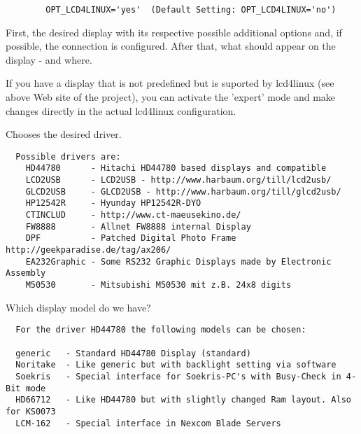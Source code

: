 \begin{example}
\begin{verbatim}
        OPT_LCD4LINUX='yes'  (Default Setting: OPT_LCD4LINUX='no')
\end{verbatim}
\end{example}

    First, the desired display with its respective possible additional options
    and, if possible, the connection is configured. After that, what should appear 
    on the display - and where.

    If you have a display that is not predefined but is suported by lcd4linux 
    (see above Web site of the project), you can activate the 'expert' mode and make 
    changes directly in the actual lcd4linux configuration.

\begin{description}

  Chooses the desired driver.

\begin{example}
\begin{verbatim}
  Possible drivers are:
    HD44780      - Hitachi HD44780 based displays and compatible
    LCD2USB      - LCD2USB - http://www.harbaum.org/till/lcd2usb/
    GLCD2USB     - GLCD2USB - http://www.harbaum.org/till/glcd2usb/
    HP12542R     - Hyunday HP12542R-DYO
    CTINCLUD     - http://www.ct-maeusekino.de/
    FW8888       - Allnet FW8888 internal Display
    DPF          - Patched Digital Photo Frame http://geekparadise.de/tag/ax206/
    EA232Graphic - Some RS232 Graphic Displays made by Electronic Assembly
    M50530       - Mitsubishi M50530 mit z.B. 24x8 digits
\end{verbatim}
\end{example}



  Which display model do we have?

\begin{example}
\begin{verbatim}
  For the driver HD44780 the following models can be chosen:

  generic	- Standard HD44780 Display (standard)
  Noritake	- Like generic but with backlight setting via software
  Soekris	- Special interface for Soekris-PC's with Busy-Check in 4-Bit mode
  HD66712	- Like HD44780 but with slightly changed Ram layout. Also for KS0073
  LCM-162	- Special interface in Nexcom Blade Servers
\end{verbatim}
\end{example}


\end{description}
